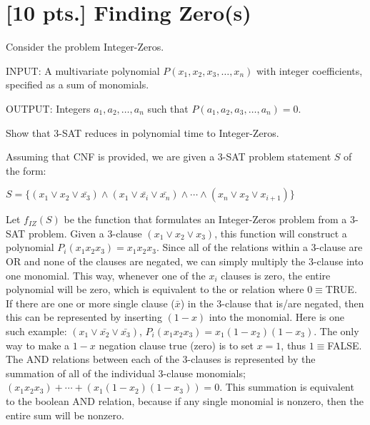 \documentclass[11pt]{article}
\begin{document}
\newpage

\section{[10 pts.] Finding Zero(s)} 

Consider the problem Integer-Zeros. 

INPUT: A multivariate polynomial $P(x_1,x_2,x_3,\ldots,x_n)$ with integer
coefficients, specified as a sum of monomials. 

OUTPUT: Integers $a_1,a_2,\ldots,a_n$ such that $P(a_1,a_2,a_3,\ldots,a_n)=0$.

Show that 3-SAT reduces in polynomial time to Integer-Zeros. 

  
%
%
Assuming that CNF is provided, we are given a 3-SAT problem statement $S$
of the form: 

$S = \{(x_1 \vee x_2 \vee \bar{x_3})
\wedge (x_1 \vee \bar{x_i} \vee \bar{x_n})
\wedge \cdots
\wedge (x_n \vee x_2 \vee x_{i+1})\}$

Let $f_{IZ}(S)$ be the function that formulates an Integer-Zeros problem 
from a 3-SAT problem. Given a 3-clause $(x_1 \vee x_2 \vee x_3)$, 
this function will construct
a polynomial $P_i(x_1x_2x_3)=x_1x_2x_3$.  
Since all of the relations within a 3-clause are OR and none of the clauses are
negated, 
we can simply multiply the 3-clause into one monomial. This way, whenever one of the
$x_i$ clauses is zero, the entire polynomial will be zero, which is equivalent to
the or relation where $0\equiv$TRUE. If there are one or more single clause ($\bar{x}$) 
in the 3-clause that is/are negated, then this can be represented by inserting $(1-x)$ into the monomial.
Here is one such example:  $(x_1 \vee \bar{x_2} \vee \bar{x_3})$, $P_i(x_1x_2x_3)=x_1(1-x_2)(1-x_3)$.
The only way to make a $1-x$ negation clause true (zero) is to set $x=1$, thus 
$1\equiv$FALSE.
The AND relations
between each of the 3-clauses is represented by the summation of all of the individual
3-clause monomials; $(x_1x_2x_3)+\cdots+(x_1(1-x_2)(1-x_3)) = 0$. This summation is equivalent to 
the boolean AND relation, because if any single monomial is nonzero, then the 
entire sum will be nonzero.

\end{document}
